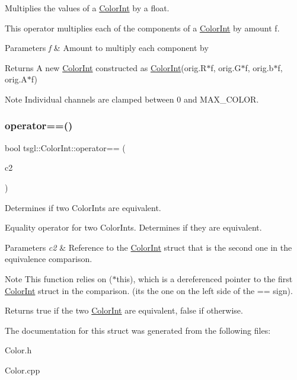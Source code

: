 Multiplies the values of a \hyperlink{structtsgl_1_1_color_int}{Color\+Int} by a float. 

This operator multiplies each of the components of a \hyperlink{structtsgl_1_1_color_int}{Color\+Int} by amount {\ttfamily f}. 
\begin{DoxyParams}{Parameters}
{\em f} & Amount to multiply each component by \\
\hline
\end{DoxyParams}
\begin{DoxyReturn}{Returns}
A new \hyperlink{structtsgl_1_1_color_int}{Color\+Int} constructed as \hyperlink{structtsgl_1_1_color_int}{Color\+Int}(orig.\+R$\ast$f, orig.\+G$\ast$f, orig.\+b$\ast$f, orig.\+A$\ast$f) 
\end{DoxyReturn}
\begin{DoxyNote}{Note}
Individual channels are clamped between 0 and M\+A\+X\+\_\+\+C\+O\+L\+OR. 
\end{DoxyNote}
\mbox{\label{structtsgl_1_1_color_int_a7d6282c79f42d4ba9a70c4475b8170c2}} 
\subsubsection{\texorpdfstring{operator==()}{operator==()}}
{\footnotesize\ttfamily bool tsgl\+::\+Color\+Int\+::operator== (\begin{DoxyParamCaption}\item[{\hyperlink{structtsgl_1_1_color_int}{Color\+Int} \&}]{c2 }\end{DoxyParamCaption})}



Determines if two Color\+Ints are equivalent. 

Equality operator for two Color\+Ints. Determines if they are equivalent. 
\begin{DoxyParams}{Parameters}
{\em c2} & Reference to the \hyperlink{structtsgl_1_1_color_int}{Color\+Int} struct that is the second one in the equivalence comparison. \\
\hline
\end{DoxyParams}
\begin{DoxyNote}{Note}
This function relies on ($\ast$this), which is a dereferenced pointer to the first \hyperlink{structtsgl_1_1_color_int}{Color\+Int} struct in the comparison. (its the one on the left side of the == sign). 
\end{DoxyNote}
\begin{DoxyReturn}{Returns}
true if the two \hyperlink{structtsgl_1_1_color_int}{Color\+Int} are equivalent, false if otherwise. 
\end{DoxyReturn}


The documentation for this struct was generated from the following files\+:\begin{DoxyCompactItemize}
\item 
Color.\+h\item 
Color.\+cpp\end{DoxyCompactItemize}

